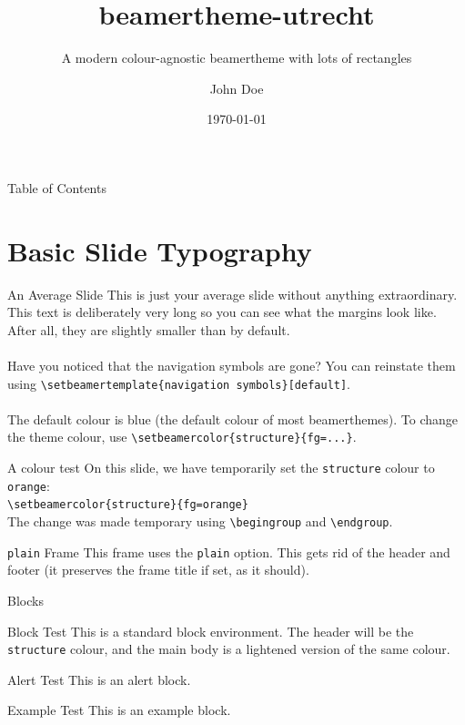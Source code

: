 \documentclass{beamer}
\title{\textsf{beamertheme-utrecht}}
\subtitle{A modern colour-agnostic beamertheme with lots of rectangles}
\author{John Doe}
\institute{\LaTeX{} University}
\date{\today}
\begin{document}
\begin{frame}
    \titlepage
\end{frame}

\begin{frame}{Table of Contents}
    \tableofcontents
\end{frame}

\section{Basic Slide Typography}

\begin{frame}{An Average Slide}
    This is just your average slide without anything extraordinary. This text is deliberately very long so you can see what the margins look like. After all, they are slightly smaller than by default.\\~\\
    Have you noticed that the navigation symbols are gone? You can reinstate them using \texttt{\textbackslash setbeamertemplate\{navigation symbols\}[default]}.\\~\\
    The default colour is blue (the default colour of most beamerthemes). To change the theme colour, use \texttt{\textbackslash setbeamercolor\{structure\}\{fg=...\}}.
\end{frame}

\begingroup
{}
\begin{frame}{A colour test}
    On this slide, we have temporarily set the \texttt{structure} colour to \texttt{orange}:\\
    \texttt{\textbackslash setbeamercolor\{structure\}\{fg=orange\}}\\
    The change was made temporary using \texttt{\textbackslash begingroup} and \texttt{\textbackslash endgroup}.
\end{frame}
\endgroup

\begin{frame}[plain]{\texttt{plain} Frame}
    This frame uses the \texttt{plain} option. This gets rid of the header and footer (it preserves the frame title if set, as it should).
\end{frame}

\begin{frame}{Blocks}
    \begin{block}{Block Test}
        This is a standard block environment. The header will be the \texttt{structure} colour, and the main body is a lightened version of the same colour.
    \end{block}
    \begin{alertblock}{Alert Test}
        This is an alert block.
    \end{alertblock}
    \begin{exampleblock}{Example Test}
        This is an example block.
    \end{exampleblock}
\end{frame}
\end{document}
